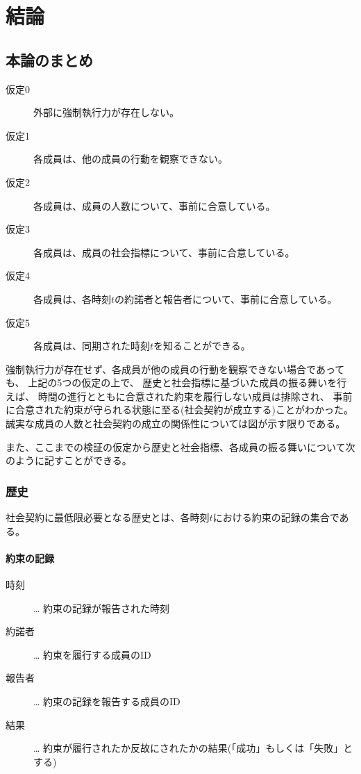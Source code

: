 \chapter{結論}
\section{本論のまとめ}
\begin{description}
  \item[仮定0] 外部に強制執行力が存在しない。 
  \item[仮定1] 各成員は、他の成員の行動を観察できない。
  \item[仮定2] 各成員は、成員の人数について、事前に合意している。
  \item[仮定3] 各成員は、成員の社会指標について、事前に合意している。
  \item[仮定4] 各成員は、各時刻$t$の約諾者と報告者について、事前に合意している。
  \item[仮定5] 各成員は、同期された時刻$t$を知ることができる。   
\end{description}

強制執行力が存在せず、各成員が他の成員の行動を観察できない場合であっても、
上記の5つの仮定の上で、
歴史と社会指標に基づいた成員の振る舞いを行えば、
時間の進行とともに合意された約束を履行しない成員は排除され、
事前に合意された約束が守られる状態に至る(社会契約が成立する)ことがわかった。
誠実な成員の人数と社会契約の成立の関係性については図が示す限りである。

また、ここまでの検証の仮定から歴史と社会指標、各成員の振る舞いについて次のように記すことができる。

\subsection{歴史}
社会契約に最低限必要となる歴史とは、各時刻$t$における約束の記録の集合である。

\subsubsection{約束の記録}
\begin{description}
  \item[時刻] … 約束の記録が報告された時刻
  \item[約諾者] … 約束を履行する成員のID
  \item[報告者] … 約束の記録を報告する成員のID 
  \item[結果] … 約束が履行されたか反故にされたかの結果(「成功」もしくは「失敗」とする)
\end{description}


